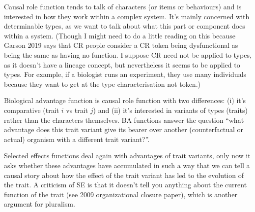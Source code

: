 \documentclass{article}
\begin{document}
Causal role function tends to talk of characters (or items or behaviours) and is interested in how they work within a complex system. It's mainly concerned with determinable types, as we want to talk about what this part or component does within a system. (Though I might need to do a little reading on this because Garson 2019 says that CR people consider a CR token being dysfunctional as being the same as having no function. I suppose CR need not be applied to types, as it doesn't have a lineage concept, but nevertheless it seems to be applied to types. For example, if a biologist runs an experiment, they use many individuals because they want to get at the type characterisation not token.)

Biological advantage function is causal role function with two differences: (i) it's comparative (trait $i$ vs trait $j$) and (ii) it's interested in variants of types (traits) rather than the characters themselves. BA functions answer the question ``what advantage does this trait variant give its bearer over another (counterfactual or actual) organism with a different trait variant?''.

Selected effects functions deal again with advantages of trait variants, only now it asks whether these advantages have accumulated in such a way that we can tell a causal story about how the effect of the trait variant has led to the evolution of the trait. A criticism of SE is that it doesn't tell you anything about the current function of the trait (see 2009 organizational closure paper), which is another argument for pluralism.
\end{document}
